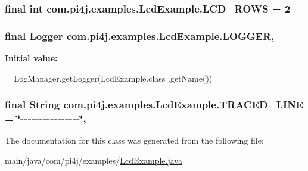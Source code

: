 \subsubsection[{L\+C\+D\+\_\+\+R\+O\+W\+S}]{\setlength{\rightskip}{0pt plus 5cm}final int com.\+pi4j.\+examples.\+Lcd\+Example.\+L\+C\+D\+\_\+\+R\+O\+W\+S = 2\hspace{0.3cm}{\ttfamily [static]}}\label{classcom_1_1pi4j_1_1examples_1_1LcdExample_aa5552e877b90e91658ff69c91110f97a}
\hypertarget{classcom_1_1pi4j_1_1examples_1_1LcdExample_ac6f94512f51589d4a4e26b46c7688ae1}{}
\subsubsection[{L\+O\+G\+G\+E\+R}]{\setlength{\rightskip}{0pt plus 5cm}final Logger com.\+pi4j.\+examples.\+Lcd\+Example.\+L\+O\+G\+G\+E\+R\hspace{0.3cm}{\ttfamily [static]}, {\ttfamily [private]}}\label{classcom_1_1pi4j_1_1examples_1_1LcdExample_ac6f94512f51589d4a4e26b46c7688ae1}
{\bfseries Initial value\+:}
\begin{DoxyCode}
= LogManager.getLogger(LcdExample.class
            .getName())
\end{DoxyCode}
\hypertarget{classcom_1_1pi4j_1_1examples_1_1LcdExample_a1a5efab5ce2806cbf7b512a6c76656c2}{}
\subsubsection[{T\+R\+A\+C\+E\+D\+\_\+\+L\+I\+N\+E}]{\setlength{\rightskip}{0pt plus 5cm}final String com.\+pi4j.\+examples.\+Lcd\+Example.\+T\+R\+A\+C\+E\+D\+\_\+\+L\+I\+N\+E = \char`\"{}-\/-\/-\/-\/-\/-\/-\/-\/-\/-\/-\/-\/-\/-\/-\/-\/\char`\"{}\hspace{0.3cm}{\ttfamily [static]}, {\ttfamily [private]}}\label{classcom_1_1pi4j_1_1examples_1_1LcdExample_a1a5efab5ce2806cbf7b512a6c76656c2}


The documentation for this class was generated from the following file\+:\begin{DoxyCompactItemize}
\item 
main/java/com/pi4j/examples/\hyperlink{LcdExample_8java}{Lcd\+Example.\+java}\end{DoxyCompactItemize}
